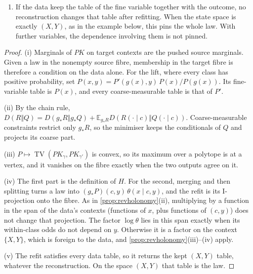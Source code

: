 \documentclass[11pt]{article}
\theoremstyle{definition}\newtheorem{definition}[theorem]{Definition}\newtheorem{remark}[theorem]{Remark}\newtheorem{example}[theorem]{Example}\newtheorem{problem}[theorem]{Open problem}\crefname{problem}{Problem}{Problems}
\begin{document}
\begin{proposition}
\begin{enumerate}
\begin{itemize}
\end{itemize}
\item[(v)] If the data keep the table of the fine variable together with the outcome, no reconstruction changes that table after refitting. When the state space is exactly $(X,Y)$, as in the example below, this pins the whole law. With further variables, the dependence involving them is not pinned.
\end{enumerate}
\end{proposition}

\begin{proof}
(i) Marginals of $PK$ on target contexts are the pushed source marginals. Given a law in the nonempty source fibre, membership in the target fibre is therefore a condition on the data alone. For the lift, where every class has positive probability, set $P(x,y)=P'(g(x),y)\,P(x)/P(g(x))$. Its fine-variable table is $P(x)$, and every coarse-measurable table is that of $P'$.

(ii) By the chain rule, $D(R\Vert Q)=D(g_*R\Vert g_*Q)+\mathbb E_{g_*R}D(R(\cdot\mid c)\Vert Q(\cdot\mid c))$. Coarse-measurable constraints restrict only $g_*R$, so the minimiser keeps the conditionals of $Q$ and projects its coarse part.

(iii) $P\mapsto\operatorname{TV}(PK_\gamma,PK_{\gamma'})$ is convex, so its maximum over a polytope is at a vertex, and it vanishes on the fibre exactly when the two outputs agree on it.

(iv) The first part is the definition of $H$. For the second, merging and then splitting turns a law into $(g_*P)(c,y)\,\theta(x\mid c,y)$, and the refit is its I-projection onto the fibre. As in \cref{prop:revholonomy}(ii), multiplying by a function in the span of the data's contexts (functions of $x$, plus functions of $(c,y)$) does not change that projection. The factor $\log\theta$ lies in this span exactly when its within-class odds do not depend on $y$. Otherwise it is a factor on the context $\{X,Y\}$, which is foreign to the data, and \cref{prop:revholonomy}(iii)--(iv) apply.

(v) The refit satisfies every data table, so it returns the kept $(X,Y)$ table, whatever the reconstruction. On the space $(X,Y)$ that table is the law.
\end{proof}
\end{document}
